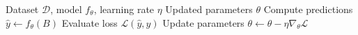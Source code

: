 \begin{algorithm}[t]
  \caption{Example Training Loop}
  \label{alg:example}
  \begin{algorithmic}[1]
    \Require Dataset \(\mathcal{D}\), model \(f_\theta\), learning rate \(\eta\)
    \Ensure Updated parameters \(\theta\)
      \State Compute predictions \(\hat{y} \gets f_\theta(B)\)
      \State Evaluate loss \(\mathcal{L}(\hat{y}, y)\)
      \State Update parameters \(\theta \gets \theta - \eta \nabla_\theta \mathcal{L}\)
    \EndFor
  \end{algorithmic}
\end{algorithm}

